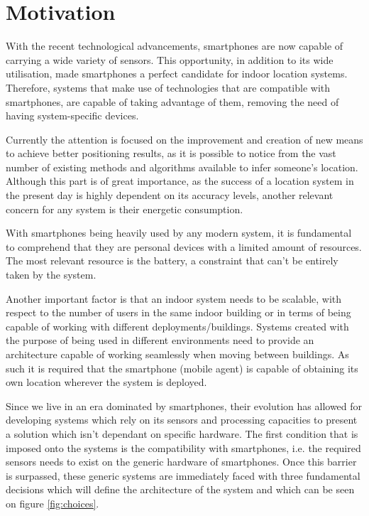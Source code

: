 \section{Motivation} 
\label{sec:int_motivation} 
 
 
With the recent technological advancements, smartphones are now capable of carrying a wide variety of sensors. This opportunity, in addition to its wide utilisation, made smartphones a perfect candidate for indoor location systems. Therefore, systems that make use of technologies that are compatible with smartphones, are capable of taking advantage of them, removing the need of having system-specific devices. 
 
Currently the attention is focused on the improvement and creation of new means to achieve better positioning results, as it is possible to notice from the vast number of existing methods and algorithms available to infer someone's location. Although this part is of great importance, as the success of a location system in the present day is highly dependent on its accuracy levels, another relevant concern for any system is their energetic consumption.

With smartphones being heavily used by any modern system, it is fundamental to comprehend that they are personal devices with a limited amount of resources. The most relevant resource is the battery, a constraint that can't be entirely taken by the system.  
 
Another important factor is that an indoor system needs to be scalable, with respect to the number of users in the same indoor building or in terms of being capable of working with different deployments/buildings. Systems created with the purpose of being used in different environments need to provide an architecture capable of working seamlessly when moving between buildings. As such it is required that the smartphone (mobile agent) is capable of obtaining its own location wherever the system is deployed.   
 
Since we live in an era dominated by smartphones, their evolution has allowed for developing systems which rely on its sensors and processing capacities to present a solution which isn't dependant on specific hardware. The first condition that is imposed onto the systems is the compatibility with smartphones, i.e. the required sensors needs to exist on the generic hardware of smartphones. Once this barrier is surpassed, these generic systems are immediately faced with three fundamental decisions which will define the architecture of the system and which can be seen on figure \ref{fig:choices}. 
 
